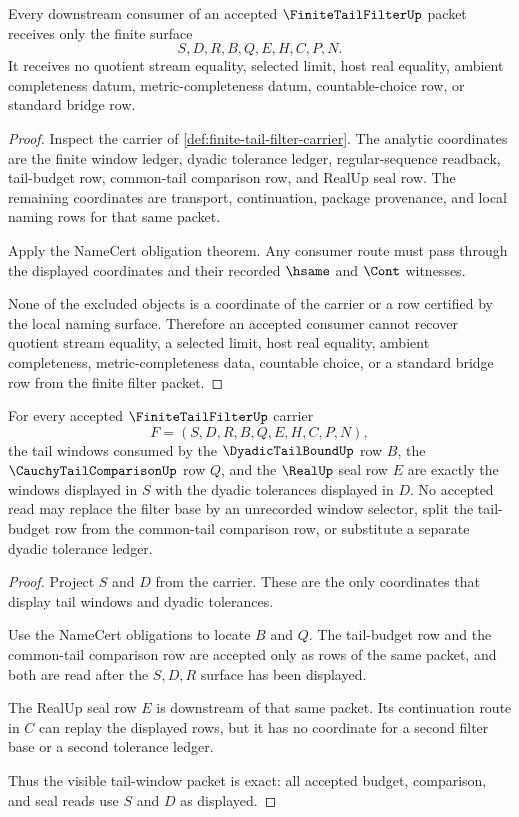 \begin{theorem}
\label{thm:finite-tail-filter-nonescape}
Every downstream consumer of an accepted $\FiniteTailFilterUp$ packet receives only the finite surface
$$
S,D,R,B,Q,E,H,C,P,N.
$$
It receives no quotient stream equality, selected limit, host real equality, ambient completeness datum, metric-completeness datum, countable-choice row, or standard bridge row.
\end{theorem}
\begin{proof}
Inspect the carrier of \autoref{def:finite-tail-filter-carrier}. The analytic coordinates are the finite window ledger, dyadic tolerance ledger, regular-sequence readback, tail-budget row, common-tail comparison row, and RealUp seal row. The remaining coordinates are transport, continuation, package provenance, and local naming rows for that same packet.

Apply the NameCert obligation theorem. Any consumer route must pass through the displayed coordinates and their recorded $\hsame$ and $\Cont$ witnesses.

None of the excluded objects is a coordinate of the carrier or a row certified by the local naming surface. Therefore an accepted consumer cannot recover quotient stream equality, a selected limit, host real equality, ambient completeness, metric-completeness data, countable choice, or a standard bridge row from the finite filter packet.
\end{proof}

\begin{theorem}
\label{thm:finite-tail-filter-tail-window-exactness}
For every accepted $\FiniteTailFilterUp$ carrier
$$
F=(S,D,R,B,Q,E,H,C,P,N),
$$
the tail windows consumed by the $\DyadicTailBoundUp$ row $B$, the $\CauchyTailComparisonUp$ row $Q$, and the $\RealUp$ seal row $E$ are exactly the windows displayed in $S$ with the dyadic tolerances displayed in $D$. No accepted read may replace the filter base by an unrecorded window selector, split the tail-budget row from the common-tail comparison row, or substitute a separate dyadic tolerance ledger.
\end{theorem}
\begin{proof}
Project $S$ and $D$ from the carrier. These are the only coordinates that display tail windows and dyadic tolerances.

Use the NameCert obligations to locate $B$ and $Q$. The tail-budget row and the common-tail comparison row are accepted only as rows of the same packet, and both are read after the $S,D,R$ surface has been displayed.

The RealUp seal row $E$ is downstream of that same packet. Its continuation route in $C$ can replay the displayed rows, but it has no coordinate for a second filter base or a second tolerance ledger.

Thus the visible tail-window packet is exact: all accepted budget, comparison, and seal reads use $S$ and $D$ as displayed.
\end{proof}

